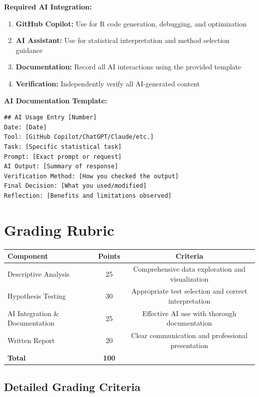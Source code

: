 \documentclass[11pt]{article}
\begin{document}
\begin{tcolorbox}[colback=aiblue!5,colframe=aiblue,boxrule=1pt,arc=2pt,left=6pt,right=6pt,top=6pt,bottom=6pt]
\textbf{Required AI Integration:}
\begin{enumerate}
\item \textbf{GitHub Copilot:} Use for R code generation, debugging, and optimization
\item \textbf{AI Assistant:} Use for statistical interpretation and method selection guidance
\item \textbf{Documentation:} Record all AI interactions using the provided template
\item \textbf{Verification:} Independently verify all AI-generated content
\end{enumerate}

\textbf{AI Documentation Template:}
\begin{verbatim}
## AI Usage Entry [Number]
Date: [Date]
Tool: [GitHub Copilot/ChatGPT/Claude/etc.]
Task: [Specific statistical task]
Prompt: [Exact prompt or request]
AI Output: [Summary of response]
Verification Method: [How you checked the output]
Final Decision: [What you used/modified]
Reflection: [Benefits and limitations observed]
\end{verbatim}
\end{tcolorbox}

\section{Grading Rubric}

\begin{center}
\begin{tabular}{lcc}
\toprule
\textbf{Component} & \textbf{Points} & \textbf{Criteria} \\
\midrule
Descriptive Analysis & 25 & Comprehensive data exploration and visualization \\
Hypothesis Testing & 30 & Appropriate test selection and correct interpretation \\
AI Integration \& Documentation & 25 & Effective AI use with thorough documentation \\
Written Report & 20 & Clear communication and professional presentation \\
\midrule
\textbf{Total} & \textbf{100} & \\
\bottomrule
\end{tabular}
\end{center}

\subsection{Detailed Grading Criteria}
\end{document}
